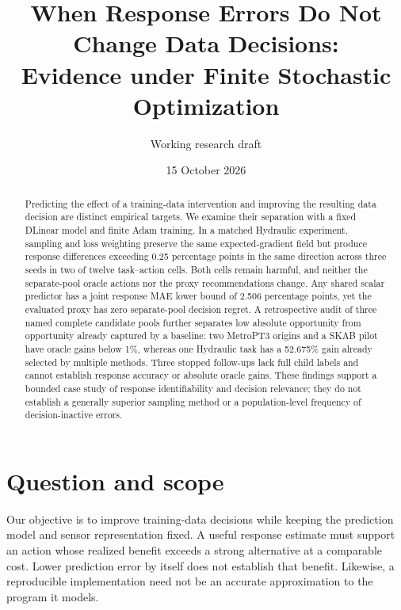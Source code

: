 \documentclass[11pt]{article}
\title{When Response Errors Do Not Change Data Decisions:\\Evidence under Finite Stochastic Optimization}
\author{Working research draft}
\date{15 October 2026}
\begin{document}
\maketitle
\begin{center}
\end{center}
\begin{abstract}
Predicting the effect of a training-data intervention and improving the resulting data decision are distinct empirical targets. We examine their separation with a fixed DLinear model and finite Adam training. In a matched Hydraulic experiment, sampling and loss weighting preserve the same expected-gradient field but produce response differences exceeding 0.25 percentage points in the same direction across three seeds in two of twelve task--action cells. Both cells remain harmful, and neither the separate-pool oracle actions nor the proxy recommendations change. Any shared scalar predictor has a joint response MAE lower bound of 2.506 percentage points, yet the evaluated proxy has zero separate-pool decision regret. A retrospective audit of three named complete candidate pools further separates low absolute opportunity from opportunity already captured by a baseline: two MetroPT3 origins and a SKAB pilot have oracle gains below 1\%, whereas one Hydraulic task has a 52.675\% gain already selected by multiple methods. Three stopped follow-ups lack full child labels and cannot establish response accuracy or absolute oracle gains. These findings support a bounded case study of response identifiability and decision relevance; they do not establish a generally superior sampling method or a population-level frequency of decision-inactive errors.
\end{abstract}

\section{Question and scope}
Our objective is to improve training-data decisions while keeping the prediction model and sensor representation fixed. A useful response estimate must support an action whose realized benefit exceeds a strong alternative at a comparable cost. Lower prediction error by itself does not establish that benefit. Likewise, a reproducible implementation need not be an accurate approximation to the program it models.
\end{document}
